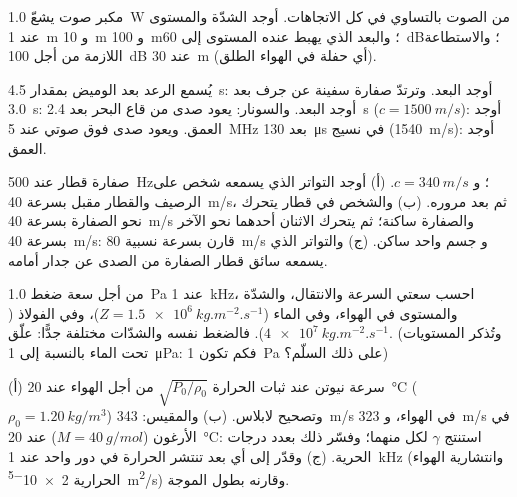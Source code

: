 \begin{exercise}[$\star$]\label{exo:b2:sound-waves:3}
مكبر صوت يشعّ \qty{1.0}{W} من الصوت بالتساوي في كل الاتجاهات.
أوجد الشدّة والمستوى عند \qty{1}{m} و \qty{10}{m} و \qty{100}{m}؛ والبعد الذي
يهبط عنده المستوى إلى \qty{60}{dB}؛ والاستطاعة اللازمة من أجل \qty{100}{dB} عند \qty{30}{m}
(أي حفلة في الهواء الطلق).
\end{exercise}

\begin{exercise}[$\star$]\label{exo:b2:sound-waves:4}
يُسمع الرعد بعد الوميض بمقدار \qty{4.5}{s}: أوجد البعد. وترتدّ صفارة سفينة
عن جرف بعد \qty{3.0}{s}: أوجد البعد. والسونار: يعود صدى من
قاع البحر بعد \qty{2.4}{s} ($c = \qty{1500}{m/s}$): أوجد العمق. ويعود صدى
فوق صوتي عند \qty{5}{MHz} بعد \qty{130}{\micro s} في نسيج
(\qty{1540}{m/s}): أوجد العمق.
\end{exercise}

\begin{exercise}[$\star\star$]\label{exo:b2:sound-waves:5}
صفارة قطار عند \qty{500}{Hz}؛ و $c = \qty{340}{m/s}$. (أ) أوجد التواتر الذي يسمعه
شخص على الرصيف والقطار مقبل بسرعة \qty{40}{m/s}، ثم
بعد مروره. (ب) والشخص في قطار يتحرك نحو
الصفارة بسرعة \qty{40}{m/s} والصفارة ساكنة؛ ثم يتحرك الاثنان أحدهما
نحو الآخر بسرعة \qty{40}{m/s}: قارن بسرعة نسبية \qty{80}{m/s} و
جسم واحد ساكن. (ج) والتواتر الذي يسمعه سائق قطار الصفارة
من الصدى عن جدار أمامه.
\end{exercise}

\begin{exercise}[$\star\star$]\label{exo:b2:sound-waves:6}
من أجل سعة ضغط \qty{1.0}{Pa} عند \qty{1}{kHz}، احسب
سعتي السرعة والانتقال، والشدّة والمستوى في
الهواء، وفي الماء ($Z = \qty{1.5e6}{kg.m^{-2}.s^{-1}}$)، وفي الفولاذ
($\qty{4e7}{kg.m^{-2}.s^{-1}}$). فالضغط نفسه والشدّات مختلفة جدًّا:
علّق. (وتُذكر المستويات تحت الماء بالنسبة إلى \qty{1}{\micro Pa}: فكم تكون
\qty{1}{Pa} على ذلك السلّم؟)
\end{exercise}

\begin{exercise}[$\star\star$]\label{exo:b2:sound-waves:7}
(أ) سرعة نيوتن عند ثبات الحرارة $\sqrt{P_0/\rho_0}$ من أجل الهواء عند
\qty{20}{\degreeCelsius} ($\rho_0 = \qty{1.20}{kg/m^3}$) وتصحيح لابلاس.
(ب) والمقيس: \qty{343}{m/s} في الهواء، و \qty{323}{m/s} في الأرغون ($M = \qty{40}{g/mol}$)
عند \qty{20}{\degreeCelsius}: استنتج $\gamma$ لكل منهما؛ وفسّر ذلك بعدد
درجات الحرية. (ج) وقدّر إلى أي بعد تنتشر الحرارة في
دور واحد عند \qty{1}{kHz} (وانتشارية الهواء الحرارية
\qty{2e-5}{m^2/s}) وقارنه بطول الموجة.
\end{exercise}

